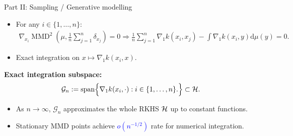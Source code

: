 \documentclass[aspectratio=169,xcolor=dvipsnames]{beamer}
\newcommand{\blue}[1]{\textcolor{blue}{#1}}
\begin{document}
\begin{frame}{Part II: Sampling / Generative modelling}
    \begin{itemize}
        \item For any $i\in\{1, \ldots, n\}$:  
    \begin{align*}
        \nabla_{x_i} \operatorname{MMD}^2\left(\mu, \frac{1}{n} \sum_{j=1}^n \delta_{x_j}\right)=0 
        \Longrightarrow \frac{1}{n} \sum_{j=1}^n \nabla_1 k\left(x_i, x_j\right)-\int \nabla_1 k\left(x_i, y\right) \mathrm{d} \mu(y)=0. 
    \end{align*}
        \item Exact integration on $x \mapsto \nabla_1 k\left(x_i, x\right)$.
    \end{itemize}
    \begin{exampleblock}{}
        \centering \textbf{Exact integration subspace:} 
        \vspace{-0.20cm}
        \begin{align*}
        \mathcal{G}_n := \operatorname{span}\Bigl\{
        \nabla_1 k(x_i,\cdot) : i\in\{1, \ldots, n\}. \Bigr\} \subset \mathcal{H}.
        \end{align*}
    \end{exampleblock}
    \begin{itemize}
        \item As $n\to\infty$, $\mathcal{G}_n$ approximates the whole RKHS $\mathcal{H}$ up to constant functions.
        \item Stationary MMD points achieve \blue{$o(n^{-1/2})$} rate for numerical integration. 
    \end{itemize}
\end{frame}
\end{document}
